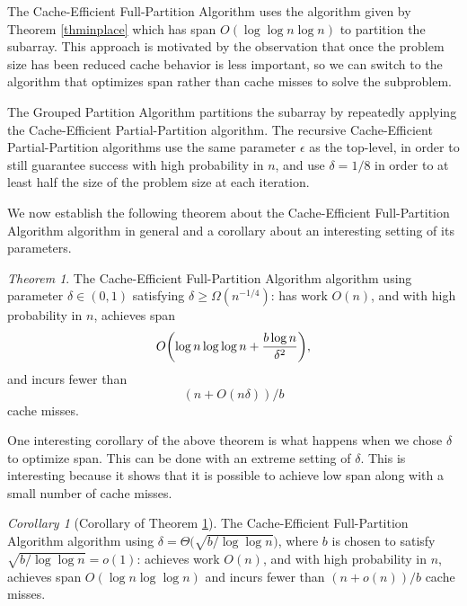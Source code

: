 \documentclass[sigconf]{acmart}
\DeclarePairedDelimiter{\paren}{(}{)}
\theoremstyle{remark}
\newtheorem{theorem}{Theorem}[section]
\newtheorem{corollary}[thm]{Corollary}
\theoremstyle{remark}
\begin{document}
The Cache-Efficient Full-Partition Algorithm uses the algorithm given by Theorem \ref{thminplace} which has span $O(\log\log n \log n)$ to partition the subarray.
This approach is motivated by the observation that once the problem size has been reduced cache behavior is less important, so we can switch to the algorithm that optimizes span rather than cache misses to solve the subproblem.

The Grouped Partition Algorithm partitions the subarray by repeatedly applying the Cache-Efficient Partial-Partition algorithm. 
The recursive Cache-Efficient Partial-Partition algorithms use the same parameter $\epsilon$ as the top-level, in order to still guarantee success with high probability in $n$, and use $\delta = 1/8$ in order to at least half the size of the problem size at each iteration. 


We now establish the following theorem about the Cache-Efficient Full-Partition Algorithm algorithm in general and a corollary about an interesting setting of its parameters.
\begin{theorem}
	\label{thm:fullPartition}
	The Cache-Efficient Full-Partition Algorithm algorithm using parameter $\delta\in(0,1)$ satisfying $\delta \ge \Omega(n^{-1/4})$: has work $O(n)$, and with high probability in $n$, achieves span $$O\paren*{\log n \log\log n +\frac{b\log n}{\delta^2}},$$
and incurs fewer than 
$$(n+O(n\delta))/b$$
cache misses.
\end{theorem}

One interesting corollary of the above theorem is what happens when we chose $\delta$ to optimize span.
This can be done with an extreme setting of $\delta$.
This is interesting because it shows that it is possible to achieve low span along with a small number of cache misses.
\begin{corollary}[Corollary of Theorem \ref{thm:fullPartition}]
	\label{cor:fullPartition}
	The Cache-Efficient Full-Partition Algorithm algorithm using $\delta = \Theta\big(\sqrt{b/\log\log n}\big)$, where $b$ is chosen to satisfy $\sqrt{b/\log\log n} = o(1)$: achieves work $O(n)$, and with high probability in $n$, achieves span $O(\log n \log\log n)$ and incurs fewer than $(n+o(n))/b$ cache misses.\\\\
\end{corollary}
\end{document}
